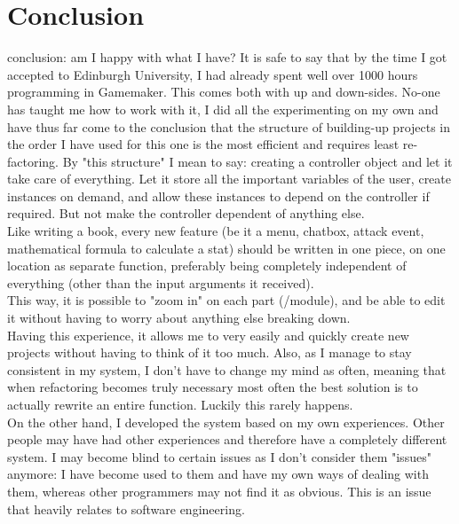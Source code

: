 \documentclass[12pt]{report}
\begin{document}
\section*{Conclusion}
conclusion: am I happy with what I have?
It is safe to say that by the time I got accepted to Edinburgh University, I had already spent well over 1000 hours programming in Gamemaker. This comes both with up and down-sides. No-one has taught me how to work with it, I did all the experimenting on my own and have thus far come to the conclusion that the structure of building-up projects in the order I have used for this one is the most efficient and requires least re-factoring. By "this structure" I mean to say: creating a controller object and let it take care of everything. Let it store all the important variables of the user, create instances on demand, and allow these instances to depend on the controller if required. But not make the controller dependent of anything else.\\
Like writing a book, every new feature (be it a menu, chatbox, attack event, mathematical formula to calculate a stat) should be written in one piece, on one location as separate function, preferably being completely independent of everything (other than the input arguments it received).\\
This way, it is possible to "zoom in" on each part (/module), and be able to edit it without having to worry about anything else breaking down.\\
Having this experience, it allows me to very easily and quickly create new projects without having to think of it too much. Also, as I manage to stay consistent in my system, I don't have to change my mind as often, meaning that when refactoring becomes truly necessary most often the best solution is to actually rewrite an entire function. Luckily this rarely happens.\\
On the other hand, I developed the system based on my own experiences. Other people may have had other experiences and therefore have a completely different system. I may become blind to certain issues as I don't consider them "issues" anymore: I have become used to them and have my own ways of dealing with them, whereas other programmers may not find it as obvious. This is an issue that heavily relates to software engineering.
\end{document}
